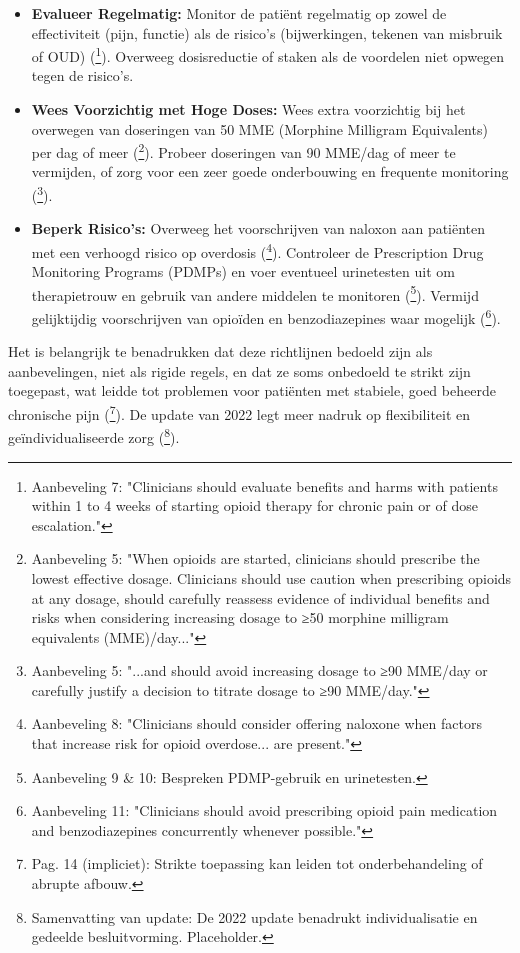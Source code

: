 \documentclass[11pt, a4paper]{report} %
\begin{document}
\begin{itemize}
    \item \textbf{Evalueer Regelmatig:} Monitor de patiënt regelmatig op zowel de effectiviteit (pijn, functie) als de risico's (bijwerkingen, tekenen van misbruik of OUD) (\cite{Dowell2016CDCGuideline}\footnote{Aanbeveling 7: "Clinicians should evaluate benefits and harms with patients within 1 to 4 weeks of starting opioid therapy for chronic pain or of dose escalation."}). Overweeg dosisreductie of staken als de voordelen niet opwegen tegen de risico's.
    \item \textbf{Wees Voorzichtig met Hoge Doses:} Wees extra voorzichtig bij het overwegen van doseringen van 50 MME (Morphine Milligram Equivalents) per dag of meer (\cite{Dowell2016CDCGuideline}\footnote{Aanbeveling 5: "When opioids are started, clinicians should prescribe the lowest effective dosage. Clinicians should use caution when prescribing opioids at any dosage, should carefully reassess evidence of individual benefits and risks when considering increasing dosage to ≥50 morphine milligram equivalents (MME)/day..."}). Probeer doseringen van 90 MME/dag of meer te vermijden, of zorg voor een zeer goede onderbouwing en frequente monitoring (\cite{Dowell2016CDCGuideline}\footnote{Aanbeveling 5: "...and should avoid increasing dosage to ≥90 MME/day or carefully justify a decision to titrate dosage to ≥90 MME/day."}).
    \item \textbf{Beperk Risico's:} Overweeg het voorschrijven van naloxon aan patiënten met een verhoogd risico op overdosis (\cite{Dowell2016CDCGuideline}\footnote{Aanbeveling 8: "Clinicians should consider offering naloxone when factors that increase risk for opioid overdose... are present."}). Controleer de Prescription Drug Monitoring Programs (PDMPs) en voer eventueel urinetesten uit om therapietrouw en gebruik van andere middelen te monitoren (\cite{Dowell2016CDCGuideline}\footnote{Aanbeveling 9 & 10: Bespreken PDMP-gebruik en urinetesten.}). Vermijd gelijktijdig voorschrijven van opioïden en benzodiazepines waar mogelijk (\cite{Dowell2016CDCGuideline}\footnote{Aanbeveling 11: "Clinicians should avoid prescribing opioid pain medication and benzodiazepines concurrently whenever possible."}).
\end{itemize}
Het is belangrijk te benadrukken dat deze richtlijnen bedoeld zijn als aanbevelingen, niet als rigide regels, en dat ze soms onbedoeld te strikt zijn toegepast, wat leidde tot problemen voor patiënten met stabiele, goed beheerde chronische pijn (\cite{Maclean2020EconomicStudiesOpioid}\footnote{Pag. 14 (impliciet): Strikte toepassing kan leiden tot onderbehandeling of abrupte afbouw.}). De update van 2022 legt meer nadruk op flexibiliteit en geïndividualiseerde zorg (\cite{Dowell2022CDCGuidelineUpdate}\footnote{Samenvatting van update: De 2022 update benadrukt individualisatie en gedeelde besluitvorming. Placeholder.}).
\end{document}
